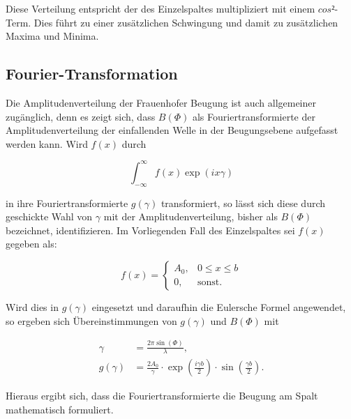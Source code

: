 Diese Verteilung entspricht der des Einzelspaltes multipliziert mit einem $cos²$-Term. Dies führt zu einer zusätzlichen 
Schwingung und damit zu zusätzlichen Maxima und Minima. 

\subsection{Fourier-Transformation}

Die Amplitudenverteilung der Frauenhofer Beugung ist auch allgemeiner zugänglich, denn es zeigt sich, 
dass $B(\Phi)$ als Fouriertransformierte der Amplitudenverteilung der einfallenden Welle in der 
Beugungsebene aufgefasst werden kann. Wird $f(x)$ durch 

\begin{equation*}
\int_{-\infty}^{\infty} f(x) \exp{\left(ix\gamma\right)}
\end{equation*}

in ihre Fouriertransformierte $g(\gamma)$ transformiert, so lässt sich diese durch geschickte Wahl von 
$\gamma$ mit der Amplitudenverteilung, bisher als $B(\Phi)$ bezeichnet, identifizieren. Im Vorliegenden 
Fall des Einzelspaltes sei $f(x)$ gegeben als:

\begin{equation*}
f(x) = 
\begin{cases}
A_0, & 0 \le x \le b\\
0  , & \text{sonst} .
\end{cases}
\end{equation*}

Wird dies in $g(\gamma)$ eingesetzt und daraufhin die Eulersche Formel angewendet, so ergeben sich Übereinstimmungen
von $g(\gamma)$ und $B(\Phi)$ mit 

\begin{align*}
\gamma &= \frac{2\pi\sin{(\Phi)}}{\lambda},\\
g(\gamma) &= \frac{2 A_0}{\gamma} \cdot \exp{\left(\frac{i\gamma b}{2}\right)}\cdot \sin{\left(\frac{\gamma b}{2}\right)}.
\end{align*}

Hieraus ergibt sich, dass die Fouriertransformierte die Beugung am Spalt mathematisch formuliert. 

